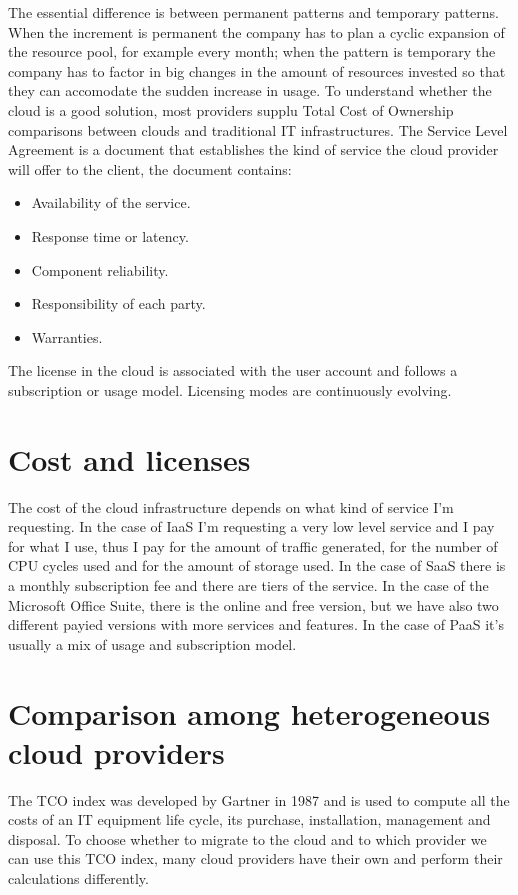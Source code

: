 The essential difference is between permanent patterns and temporary patterns. When the increment is permanent the company has to plan a cyclic expansion of the resource pool, for example every month; when the pattern is temporary the company has to factor in big changes in the amount of resources invested so that they can accomodate the sudden increase in usage. \n
To understand whether the cloud is a good solution, most providers supplu Total Cost of Ownership comparisons between clouds and traditional IT infrastructures. \n
The Service Level Agreement is a document that establishes the kind of service the cloud provider will offer to the client, the document contains:
\begin{itemize}
    \item Availability of the service.
    \item Response time or latency.
    \item Component reliability.
    \item Responsibility of each party.
    \item Warranties.
\end{itemize}
The license in the cloud is associated with the user account and follows a subscription or usage model. Licensing modes are continuously evolving.
\section{Cost and licenses}
The cost of the cloud infrastructure depends on what kind of service I'm requesting. \n
In the case of IaaS I'm requesting a very low level service and I pay for what I use, thus I pay for the amount of traffic generated, for the number of CPU cycles used and for the amount of storage used. \n
In the case of SaaS there is a monthly subscription fee and there are tiers of the service. In the case of the Microsoft Office Suite, there is the online and free version, but we have also two different payied versions with more services and features. \n
In the case of PaaS it's usually a mix of usage and subscription model.
\section{Comparison among heterogeneous cloud providers}
The TCO index was developed by Gartner in 1987 and is used to compute all the costs of an IT equipment life cycle, its purchase, installation, management and disposal. \n
To choose whether to migrate to the cloud and to which provider we can use this TCO index, many cloud providers have their own and perform their calculations differently. \n